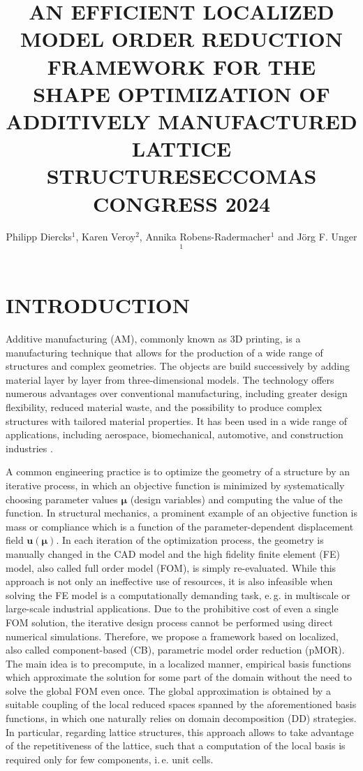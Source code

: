 \documentclass[a4paper]{eccomas_paper-2024}
\title{AN EFFICIENT LOCALIZED MODEL ORDER REDUCTION FRAMEWORK FOR THE SHAPE OPTIMIZATION OF ADDITIVELY MANUFACTURED LATTICE STRUCTURES\break ECCOMAS CONGRESS 2024}
\author{Philipp Diercks$^{1}$, Karen Veroy$^{2}$, Annika Robens-Radermacher$^{1}$ and Jörg F. Unger$^{1}$}
\makeatletter
\newcommand{\ie}{i.\,e.\@\xspace}
\newcommand{\eg}{e.\,g.\@\xspace}
\makeatother
\begin{document}
\thispagestyle{empty}

\section{INTRODUCTION}%
\label{sec:introduction}

Additive manufacturing (AM), commonly known as 3D printing, is a manufacturing technique that allows for the production of a wide range of structures and complex geometries.
The objects are build successively by adding material layer by layer from three-dimensional models.
The technology offers numerous advantages over conventional manufacturing, including greater design flexibility, reduced material waste, and the possibility to produce complex structures with tailored material properties.
It has been used in a wide range of applications, including aerospace, biomechanical, automotive, and construction industries .%

A common engineering practice is to optimize the geometry of a structure by an iterative process, in which an objective function is minimized by systematically choosing parameter values $\bm\mu$ (design variables) and computing the value of the function.
In structural mechanics, a prominent example of an objective function is mass or compliance which is a function of the parameter-dependent displacement field $\bm{u}(\bm\mu)$.
In each iteration of the optimization process, the geometry is manually changed in the CAD model and the high fidelity finite element (FE) model, also called full order model (FOM), is simply re-evaluated.
While this approach is not only an ineffective use of resources, it is also infeasible when solving the FE model is a computationally demanding task, \eg{} in multiscale or large-scale industrial applications.
Due to the prohibitive cost of even a single FOM solution, the iterative design process cannot be performed using direct numerical simulations.
Therefore, we propose a framework based on localized, also called component-based (CB), parametric model order reduction (pMOR).
The main idea is to precompute, in a localized manner, empirical basis functions which approximate the solution for some part of the domain without the need to solve the global FOM even once.
The global approximation is obtained by a suitable coupling of the local reduced spaces spanned by the aforementioned basis functions, in which one naturally relies on domain decomposition (DD) strategies.
In particular, regarding lattice structures, this approach allows to take advantage of the repetitiveness of the lattice, such that a computation of the local basis is required only for few components, \ie{} unit cells.
\end{document}
